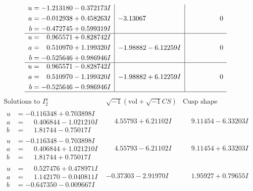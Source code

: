 \documentclass[1p]{elsarticle_modified}
\theoremstyle{definition}
\newcommand{\I}{\sqrt{-1}}
\begin{document}
$$\begin{array}{c|c|c}
\begin{aligned}
u &= -1.213180 - 0.372173 I \\
a &= -0.012938 + 0.458263 I \\
b &= -0.472745 + 0.599319 I\end{aligned}
 & -3.13067\phantom{ +0.000000I} & \phantom{-0.000000 } 0 \\ \hline\begin{aligned}
u &= \phantom{-}0.965571 + 0.828742 I \\
a &= \phantom{-}0.510970 + 1.199320 I \\
b &= -0.525646 + 0.986946 I\end{aligned}
 & -1.98882 - 6.12259 I & \phantom{-0.000000 } 0 \\ \hline\begin{aligned}
u &= \phantom{-}0.965571 - 0.828742 I \\
a &= \phantom{-}0.510970 - 1.199320 I \\
b &= -0.525646 - 0.986946 I\end{aligned}
 & -1.98882 + 6.12259 I & \phantom{-0.000000 } 0\\
 \hline 
 \end{array}$$\newpage$$\begin{array}{c|c|c}  
\text{Solutions to }I^u_{2}& \I (\text{vol} + \sqrt{-1}CS) & \text{Cusp shape}\\
 \hline 
\begin{aligned}
u &= -0.116348 + 0.703898 I \\
a &= \phantom{-}0.406844 - 1.021210 I \\
b &= \phantom{-}1.81744 - 0.75017 I\end{aligned}
 & \phantom{-}4.55793 + 6.21102 I & \phantom{-}9.11454 - 6.33203 I \\ \hline\begin{aligned}
u &= -0.116348 - 0.703898 I \\
a &= \phantom{-}0.406844 + 1.021210 I \\
b &= \phantom{-}1.81744 + 0.75017 I\end{aligned}
 & \phantom{-}4.55793 - 6.21102 I & \phantom{-}9.11454 + 6.33203 I \\ \hline\begin{aligned}
u &= \phantom{-}0.527476 + 0.478971 I \\
a &= \phantom{-}1.142170 - 0.040811 I \\
b &= -0.647350 - 0.009667 I\end{aligned}
 & -0.37303 - 2.91970 I & \phantom{-}1.95927 + 0.79655 I \\ \hline\begin{aligned}

\end{aligned}
\end{array}$$
\end{document}
